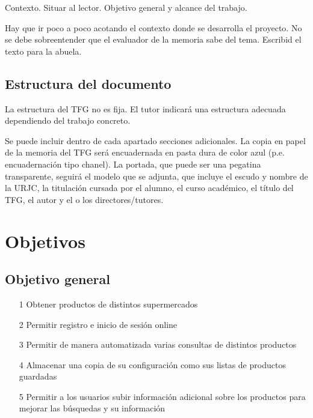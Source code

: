 \documentclass[12pt,twoside,titlepage]{report}
\newcommand\blankpage{%
    \newpage
    \null
    \thispagestyle{empty}%
    \newpage}
\begin{document}
Contexto. Situar al lector. Objetivo general y alcance del trabajo.

Hay que ir poco a poco acotando el contexto donde se desarrolla el proyecto. No se debe sobreentender que el evaluador de la memoria sabe del tema. Escribid el texto para la abuela.


\section{Estructura del documento}

La estructura del TFG no es fija. El tutor indicará una estructura adecuada dependiendo del trabajo concreto.

Se puede incluir dentro de cada apartado secciones adicionales. La copia en papel de la memoria del TFG será encuadernada en pasta dura de color azul (p.e. encuadernación tipo chanel). La portada, que puede ser una pegatina transparente, seguirá el modelo que se adjunta, que incluye el escudo y nombre de la URJC, la titulación cursada por el alumno, el curso académico, el título del TFG, el autor y el o los directores/tutores.










\chapter{Objetivos}




\section{Objetivo general}

\begin{itemize}

	\item[1] Obtener productos de distintos supermercados
	\item[2] Permitir registro e inicio de sesión online
	\item[3] Permitir de manera automatizada varias consultas de distintos productos
	\item[4] Almacenar una copia de su configuración como sus listas de productos guardadas
	\item[5] Permitir a los usuarios subir información adicional sobre los productos para mejorar las búsquedas y su información

\end{itemize}
\end{document}
